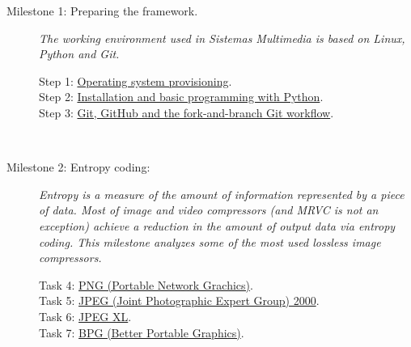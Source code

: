 \begin{description}
\item [Milestone 1: {\normalfont Preparing the framework.}]  \emph{The
working environment used in Sistemas Multimedia is based on Linux,
Python and Git.}
  \begin{description}
  \item [Step 1: {\normalfont
      \href{https://sistemas-multimedia.github.io/contents/provisioning/}{Operating
        system provisioning}.}]
  \item [Step 2: {\normalfont
      \href{https://sistemas-multimedia.github.io/contents/python/}{Installation
        and basic programming with Python}.}]
  \item [Step 3: {\normalfont
      \href{https://sistemas-multimedia.github.io/contents/git/}{Git,
        GitHub and the fork-and-branch Git workflow}.}]
  \end{description}
  ~\newline

\item [Milestone 2: {\normalfont Entropy coding:}] \emph{Entropy is a
measure of the amount of information represented by a piece of
data. Most of image and video compressors (and MRVC is not an
exception) achieve a reduction in the amount of output data via
entropy coding. This milestone analyzes some of the most used lossless
image compressors.}
  \begin{description}
  \item [Task 4: {\normalfont
      \href{https://sistemas-multimedia.github.io/contents/PNG/}{PNG
        (Portable Network Grachics)}.}]
  \item [Task 5: {\normalfont
      \href{https://sistemas-multimedia.github.io/contents/JPEG2000/}{JPEG
        (Joint Photographic Expert Group) 2000}.}]
  \item [Task 6: {\normalfont
      \href{https://sistemas-multimedia.github.io/contents/JPEG_XL/}{JPEG
        XL}.}]
  \item [Task 7: {\normalfont
      \href{https://sistemas-multimedia.github.io/contents/BGP/}{BPG
        (Better Portable Graphics)}.}]
  \end{description}
  ~\newline


\end{description}
